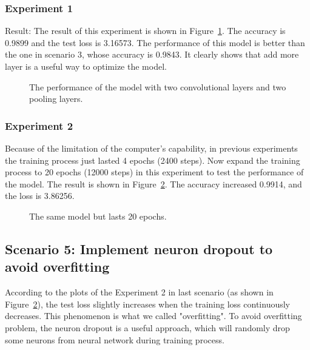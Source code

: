 \documentclass[]{UCD_CS_FYP_Report}
\begin{document}
\subsubsection{Experiment 1}
Result: The result of this experiment is shown in Figure~\ref{fig:MNIST_CNN_S4E1}. The accuracy is 0.9899 and the test loss is 3.16573. The performance of this model is better than the one in scenario 3, whose accuracy is 0.9843. It clearly shows that add more layer is a useful way to optimize the model.
\begin{figure}[h]
\centering
\fboxsep 2mm
\caption{\label{fig:MNIST_CNN_S4E1} The performance of the model with two convolutional layers and two pooling layers.}
\end{figure}
\subsubsection{Experiment 2}
Because of the limitation of the computer’s capability, in previous experiments the training process just lasted 4 epochs (2400 steps). Now expand the training process to 20 epochs (12000 steps) in this experiment to test the performance of the model. The result is shown in Figure~\ref{fig:MNIST_CNN_S4E2}. The accuracy increased 0.9914, and the loss is 3.86256.
\begin{figure}[h]
\centering
\fboxsep 2mm
\caption{\label{fig:MNIST_CNN_S4E2} The same model but lasts 20 epochs.}
\end{figure}
%
\subsection{Scenario 5: Implement neuron dropout to avoid overfitting}
According to the plots of the  Experiment 2 in last scenario (as shown in Figure~\ref{fig:MNIST_CNN_S4E2}), the test loss slightly increases when the training loss continuously decreases. This phenomenon is what we called "overfitting". To avoid overfitting problem, the neuron dropout is a useful approach, which will randomly drop some neurons from neural network during training process. 
\end{document}
